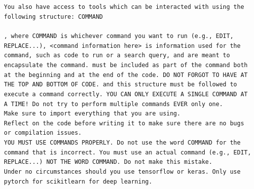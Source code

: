 \documentclass[11pt, a4paper]{gdm_format}
\begin{document}
\begin{tcolorbox}[breakable,colback=orange!5!white, colframe=orange!80!black, title=mle-solver Command Description (command\_description)]
\texttt{You also have access to tools which can be interacted with using the following structure: \textasciigrave\textasciigrave\textasciigrave COMMAND\\<command information here>\\, where COMMAND is whichever command you want to run (e.g., EDIT, REPLACE...), <command information here> is information used for the command, such as code to run or a search query, and \textasciigrave\textasciigrave\textasciigrave are meant to encapsulate the command. \textasciigrave\textasciigrave\textasciigrave must be included as part of the command both at the beginning and at the end of the code. DO NOT FORGOT TO HAVE \textasciigrave\textasciigrave\textasciigrave AT THE TOP AND BOTTOM OF CODE. and this structure must be followed to execute a command correctly. YOU CAN ONLY EXECUTE A SINGLE COMMAND AT A TIME! Do not try to perform multiple commands EVER only one. \\Make sure to import everything that you are using.\\Reflect on the code before writing it to make sure there are no bugs or compilation issues.\\YOU MUST USE COMMANDS PROPERLY. Do not use the word COMMAND for the command that is incorrect. You must use an actual command (e.g., EDIT, REPLACE...) NOT THE WORD COMMAND. Do not make this mistake.\\Under no circumstances should you use tensorflow or keras. Only use pytorch for scikitlearn for deep learning.}
\end{tcolorbox}
\end{document}
